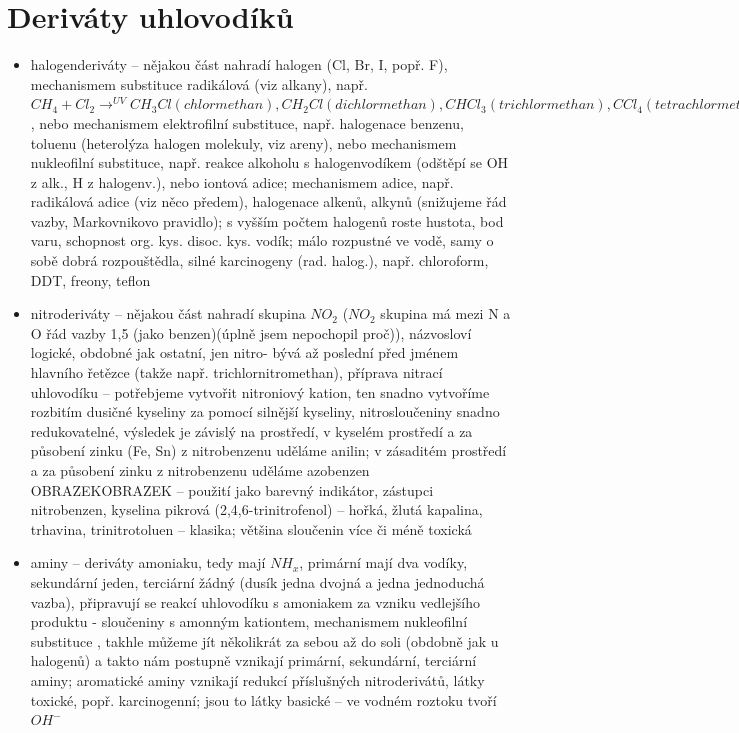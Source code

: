 \documentclass{article}
\begin{document}
\section{Deriváty uhlovodíků}
\begin{itemize}
  \item halogenderiváty -- nějakou část nahradí halogen (Cl, Br, I, popř. F), mechanismem substituce radikálová (viz alkany), např. $CH_4 + Cl_2 \rightarrow^{UV} CH_3Cl (chlormethan), CH_2Cl (dichlormethan), CHCl_3 (trichlormethan), CCl_4 (tetrachlormethan)$, nebo mechanismem elektrofilní substituce, např. halogenace benzenu, toluenu (heterolýza halogen molekuly, viz areny), nebo mechanismem nukleofilní substituce, např. reakce alkoholu s halogenvodíkem (odštěpí se OH z alk., H z halogenv.), nebo iontová adice; mechanismem adice, např. radikálová adice (viz něco předem), halogenace alkenů, alkynů (snižujeme řád vazby, Markovnikovo pravidlo); s vyšším počtem halogenů roste hustota, bod varu, schopnost org. kys. disoc. kys. vodík; málo rozpustné ve vodě, samy o sobě dobrá rozpouštědla, silné karcinogeny (rad. halog.), např. chloroform, DDT, freony, teflon
  \item nitroderiváty -- nějakou část nahradí skupina $NO_2$ ($NO_2$ skupina má mezi N a O řád vazby 1,5 (jako benzen)(úplně jsem nepochopil proč)), názvosloví logické, obdobné jak ostatní, jen nitro- bývá až poslední před jménem hlavního řetězce (takže např. trichlornitromethan), příprava nitrací uhlovodíku -- potřebjeme vytvořit nitroniový kation, ten snadno vytvoříme rozbitím dusičné kyseliny za pomocí silnější kyseliny, nitrosloučeniny snadno redukovatelné, výsledek je závislý na prostředí, v kyselém prostředí a za působení zinku (Fe, Sn) z nitrobenzenu uděláme anilin; v zásaditém prostředí a za působení zinku z nitrobenzenu uděláme azobenzen OBRAZEKOBRAZEK -- použití jako barevný indikátor, zástupci nitrobenzen, kyselina pikrová (2,4,6-trinitrofenol) -- hořká, žlutá kapalina, trhavina, trinitrotoluen -- klasika; většina sloučenin více či méně toxická
  \item aminy -- deriváty amoniaku, tedy mají $NH_x$, primární mají dva vodíky, sekundární jeden, terciární žádný (dusík jedna dvojná a jedna jednoduchá vazba), připravují se reakcí uhlovodíku s amoniakem za vzniku vedlejšího produktu - sloučeniny s amonným kationtem, mechanismem nukleofilní substituce , takhle můžeme jít několikrát za sebou až do soli (obdobně jak u halogenů) a takto nám postupně vznikají primární, sekundární, terciární aminy; aromatické aminy vznikají redukcí příslušných nitroderivátů, látky toxické, popř. karcinogenní; jsou to látky basické -- ve vodném roztoku tvoří $OH^-$
\end{itemize}
\end{document}
